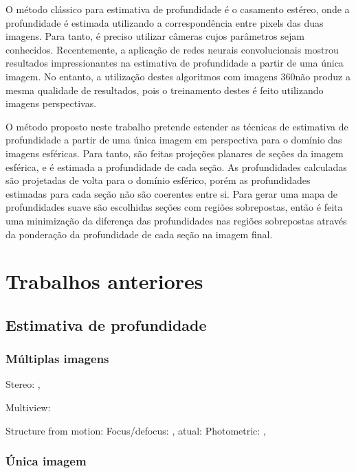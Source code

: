 \documentclass[cic,tc]{iiufrgs}
\begin{document}
O método clássico para estimativa de profundidade é o casamento estéreo, onde a profundidade é estimada utilizando a correspondência entre pixels das duas imagens. Para tanto, é preciso utilizar câmeras cujos parâmetros sejam conhecidos. Recentemente, a aplicação de redes neurais convolucionais mostrou resultados impressionantes na estimativa de profundidade a partir de uma única imagem. No entanto, a utilização destes algoritmos com imagens 360\degree não produz a mesma qualidade de resultados, pois o treinamento destes é feito utilizando imagens perspectivas. 

O método proposto neste trabalho pretende estender as técnicas de estimativa de profundidade a partir de uma única imagem em perspectiva para o domínio das imagens esféricas. Para tanto, são feitas projeções planares de seções da imagem esférica, e é estimada a profundidade de cada seção. As profundidades calculadas são projetadas de volta para o domínio esférico, porém as profundidades estimadas para cada seção não são coerentes entre si.
Para gerar uma mapa de profundidades suave são escolhidas seções com regiões sobrepostas, então é feita uma minimização da diferença das profundidades nas regiões sobrepostas através da ponderação da profundidade de cada seção na imagem final.


\chapter{Trabalhos anteriores}

\section{Estimativa de profundidade}

\subsection{Múltiplas imagens}
Stereo: \citet{stereoSurvey2001},  \citet{stereoSurvey2016}

Multiview: \citet{multiViewStereo2015}

Structure from motion: \citet{structMotion2016}
Focus/defocus: \citet{defocus1987}, atual: \citet{defocus2015}
Photometric: \citet{photometricStereo1989}, \citet{photometricStereo2012}

\subsection{Única imagem}
\end{document}
